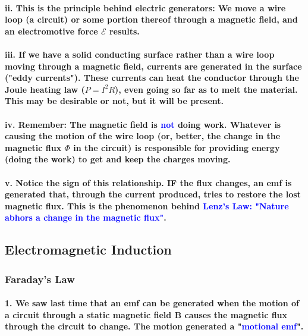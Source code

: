 \documentclass{article}
\begin{document}
\paragraph{\indent\indent ii. This is the principle behind electric generators: We move a wire loop (a circuit) or some portion thereof through a magnetic field, and an electromotive force $\mathcal{E}$ results.}
\paragraph{\indent\indent iii. If we have a solid conducting surface rather than a wire loop moving through a magnetic field, currents are generated in the surface ("eddy currents"). These currents can heat the conductor through the Joule heating law ($P=I^2R$), even going so far as to melt the material. This may be desirable or not, but it will be present.}
\paragraph{\indent\indent iv. Remember: The magnetic field is \textcolor{blue}{not} doing work. Whatever is causing the motion of the wire loop (or, better, the change in the magnetic flux $\Phi$ in the circuit) is responsible for providing energy (doing the work) to get and keep the charges moving.}
\paragraph{\indent\indent v. Notice the sign of this relationship. IF the flux changes, an emf is generated that, through the current produced, tries to restore the lost magnetic flux. This is the phenomenon behind \textcolor{blue}{Lenz's Law: "Nature abhors a change in the magnetic flux"}.}
\subsection{Electromagnetic Induction}
\subsubsection{Faraday's Law}
\paragraph{1. We saw last time that an emf can be generated when the motion of a circuit through a static magnetic field $\boldsymbol{B}$ causes the magnetic flux through the circuit to change. The motion generated a "\textcolor{blue}{motional emf}".}
\end{document}
